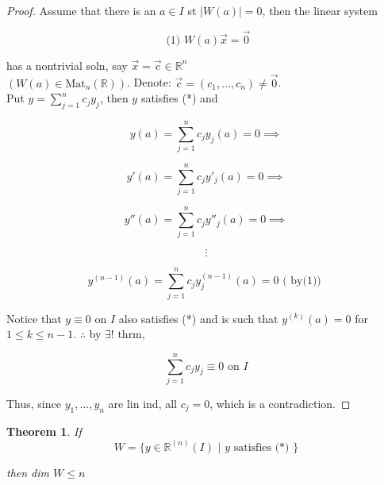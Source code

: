 \documentclass{book}
\newtheorem*{theorem}{Theorem}
\theoremstyle{definition}
\begin{document}
\begin{proof}
  Assume that there is an \( a \in I \) st \( |W(a)| = 0 \), then
  the linear system 

  \[ \text{ (1) } W(a) \vec{x} = \vec{0} \]

  has a nontrivial soln, say \( \vec{x} = \vec{c} \in \mathbb{R}^n \)\\
  \( (W(a) \in \text{Mat}_n( \mathbb{R})) \). Denote: \( \vec{c} = (c_1,
  \dots , c_n) \neq \vec{0} \). \\[5mm]

  Put \( y = \sum_{j=1}^n c_j y_j \), then \( y \) satisfies (*) and %

  \[  y(a) = \sum_{j=1}^n c_j y_j(a) = 0  \implies\]

  \[ y'(a) = \sum_{j=1}^n c_j y'_j(a) = 0 \implies\]

  \[  y''(a) = \sum_{j=1}^n c_j y''_j(a) = 0  \implies\]

  \[ \vdots \]

  \[  y^{(n-1)}(a) = \sum_{j=1}^n c_j y^{(n-1)}_j(a) = 0 \text{ ( by(1)) } \]

  Notice that \( y \equiv 0 \) on \( I  \) also satisfies (*) and is such
  that \( y^{(k)}(a) = 0 \) for \( 1 \leq k \leq n-1 \). \( \therefore \)
  by \( \exists \)! thrm, 

  \[ \sum_{j=1}^n c_j y_j \equiv 0 \text{ on } I \]

  Thus, since \( y_1, \dots , y_n \) are lin ind, all \( c_j = 0 \), which
  is a contradiction.  
\end{proof}

\begin{theorem}
  If
  \[ W = \{ y \in \mathbb{R}^{(n)}(I) \text{ | } y \text{ satisfies (*) }  \}
  \]

  then dim \( W \leq n  \)
\end{theorem}
\end{document}
